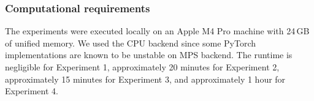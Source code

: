 \subsubsection{Computational requirements}
The experiments were executed locally on an Apple M4 Pro machine with 24\,GB of unified memory. We used the CPU backend since some PyTorch implementations are known to be unstable on MPS backend. 
The runtime is negligible for Experiment 1, approximately 20 minutes for Experiment 2, approximately 15 minutes for Experiment 3, and approximately 1 hour for Experiment 4.

